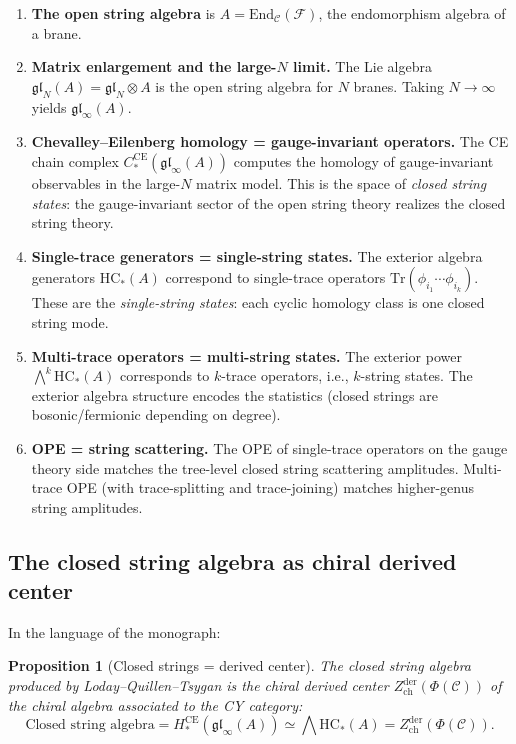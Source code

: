 \documentclass[11pt]{article}
\newtheorem{proposition}[theorem]{Proposition}
\theoremstyle{definition}
\theoremstyle{remark}
\newcommand{\End}{\mathrm{End}}
\newcommand{\Tr}{\mathrm{Tr}}
\newcommand{\HC}{\mathrm{HC}}
\newcommand{\CE}{\mathrm{CE}}
\newcommand{\cC}{\mathcal{C}}
\newcommand{\cF}{\mathcal{F}}
\newcommand{\frakgl}{\mathfrak{gl}}
\begin{document}
\begin{enumerate}[label=(\arabic*)]
 \item \textbf{The open string algebra} is $A = \End_\cC(\cF)$, the
 endomorphism algebra of a brane.

 \item \textbf{Matrix enlargement and the large-$N$ limit.} The Lie algebra
 $\frakgl_N(A) = \frakgl_N \otimes A$ is the open string algebra for $N$
 branes. Taking $N \to \infty$ yields $\frakgl_\infty(A)$.

 \item \textbf{Chevalley--Eilenberg homology = gauge-invariant operators.}
 The CE chain complex $C_*^{\CE}(\frakgl_\infty(A))$ computes the homology
 of gauge-invariant observables in the large-$N$ matrix model. This is the
 space of \emph{closed string states}: the gauge-invariant sector of the
 open string theory realizes the closed string theory.

 \item \textbf{Single-trace generators = single-string states.} The exterior
 algebra generators $\HC_*(A)$ correspond to single-trace operators
 $\Tr(\phi_{i_1} \cdots \phi_{i_k})$. These are the \emph{single-string
 states}: each cyclic homology class is one closed string mode.

 \item \textbf{Multi-trace operators = multi-string states.} The exterior
 power $\bigwedge^k \HC_*(A)$ corresponds to $k$-trace operators, i.e.,
 $k$-string states. The exterior algebra structure encodes the statistics
 (closed strings are bosonic/fermionic depending on degree).

 \item \textbf{OPE = string scattering.} The OPE of single-trace operators
 on the gauge theory side matches the tree-level closed string scattering
 amplitudes. Multi-trace OPE (with trace-splitting and trace-joining)
 matches higher-genus string amplitudes.
\end{enumerate}

\subsection{The closed string algebra as chiral derived center}
\label{sec:derived-center}

In the language of the monograph:

\begin{proposition}[Closed strings = derived center]
\label{prop:closed-derived-center}
The closed string algebra produced by Loday--Quillen--Tsygan is the
\emph{chiral derived center} $Z^{\mathrm{der}}_{\mathrm{ch}}(\Phi(\cC))$ of
the chiral algebra associated to the CY category:
\[
 \text{Closed string algebra}
 = H_*^{\CE}(\frakgl_\infty(A))
 \simeq \bigwedge \HC_*(A)
 = Z^{\mathrm{der}}_{\mathrm{ch}}(\Phi(\cC)).
\]
\end{proposition}
\end{document}
